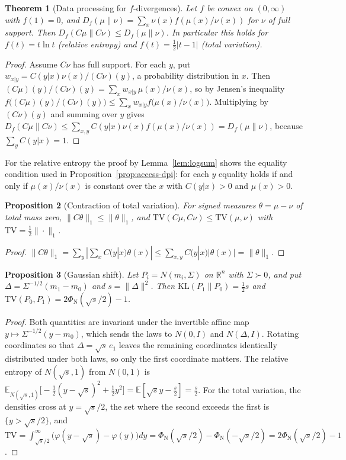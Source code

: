 \documentclass[11pt,oneside]{book}
\newtheorem{theorem}{Theorem}[chapter]
\newtheorem{proposition}[theorem]{Proposition}
\theoremstyle{definition}
\theoremstyle{remark}
\begin{document}
\begin{theorem}[Data processing for $f$-divergences]\label{thm:app-dpi}
Let $f$ be convex on $(0,\infty)$ with $f(1)=0$, and $D_f(\mu\|\nu)=\sum_x\nu(x)f(\mu(x)/\nu(x))$ for $\nu$ of full support. Then $D_f(C\mu\|C\nu)\leq D_f(\mu\|\nu)$. In particular this holds for $f(t)=t\ln t$ (relative entropy) and $f(t)=\tfrac12|t-1|$ (total variation).
\end{theorem}

\begin{proof}
Assume $C\nu$ has full support. For each $y$, put $w_{x|y}=C(y|x)\nu(x)/(C\nu)(y)$, a probability distribution in $x$. Then $(C\mu)(y)/(C\nu)(y)=\sum_xw_{x|y}\,\mu(x)/\nu(x)$, so by Jensen's inequality $f\bigl((C\mu)(y)/(C\nu)(y)\bigr)\leq\sum_xw_{x|y}f\bigl(\mu(x)/\nu(x)\bigr)$. Multiplying by $(C\nu)(y)$ and summing over $y$ gives $D_f(C\mu\|C\nu)\leq\sum_{x,y}C(y|x)\nu(x)f(\mu(x)/\nu(x))=D_f(\mu\|\nu)$, because $\sum_yC(y|x)=1$.
\end{proof}

For the relative entropy the proof by Lemma~\ref{lem:logsum} shows the equality condition used in Proposition~\ref{prop:access-dpi}: for each $y$ equality holds if and only if $\mu(x)/\nu(x)$ is constant over the $x$ with $C(y|x)>0$ and $\mu(x)>0$.

\begin{proposition}[Contraction of total variation]\label{prop:app-tv}
For signed measures $\theta=\mu-\nu$ of total mass zero, $\|C\theta\|_1\leq\|\theta\|_1$, and $\mathrm{TV}(C\mu,C\nu)\leq\mathrm{TV}(\mu,\nu)$ with $\mathrm{TV}=\tfrac12\|\cdot\|_1$.
\end{proposition}

\begin{proof}
$\|C\theta\|_1=\sum_y|\sum_xC(y|x)\theta(x)|\leq\sum_{x,y}C(y|x)|\theta(x)|=\|\theta\|_1$.
\end{proof}

\begin{proposition}[Gaussian shift]\label{prop:app-gauss}
Let $P_i=N(m_i,\Sigma)$ on $\mathbb R^n$ with $\Sigma\succ0$, and put $\Delta=\Sigma^{-1/2}(m_1-m_0)$ and $s=\|\Delta\|^2$. Then $\mathrm{KL}(P_1\|P_0)=\tfrac12s$ and $\mathrm{TV}(P_0,P_1)=2\Phi_{\mathrm N}(\sqrt s/2)-1$.
\end{proposition}

\begin{proof}
Both quantities are invariant under the invertible affine map $y\mapsto\Sigma^{-1/2}(y-m_0)$, which sends the laws to $N(0,I)$ and $N(\Delta,I)$. Rotating coordinates so that $\Delta=\sqrt s\,e_1$ leaves the remaining coordinates identically distributed under both laws, so only the first coordinate matters. The relative entropy of $N(\sqrt s,1)$ from $N(0,1)$ is $\mathbb E_{N(\sqrt s,1)}\bigl[-\tfrac12(y-\sqrt s)^2+\tfrac12y^2\bigr]=\mathbb E[\sqrt sy-\tfrac s2]=\tfrac s2$. For the total variation, the densities cross at $y=\sqrt s/2$, the set where the second exceeds the first is $\{y>\sqrt s/2\}$, and $\mathrm{TV}=\int_{\sqrt s/2}^\infty\bigl(\varphi(y-\sqrt s)-\varphi(y)\bigr)dy=\Phi_{\mathrm N}(\sqrt s/2)-\Phi_{\mathrm N}(-\sqrt s/2)=2\Phi_{\mathrm N}(\sqrt s/2)-1$.
\end{proof}
\end{document}
